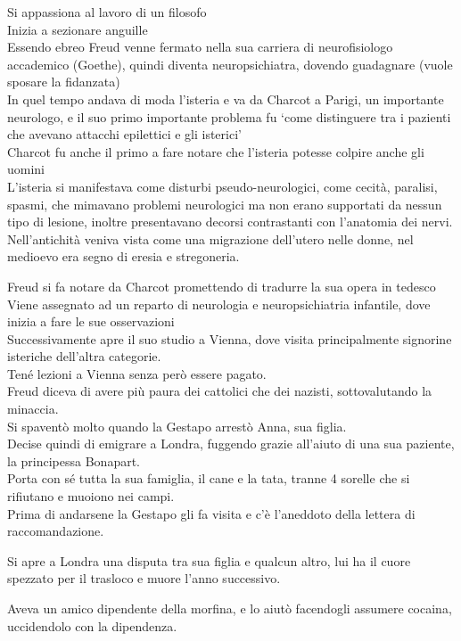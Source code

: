 \documentclass[
]{article}
\begin{document}
Si appassiona al lavoro di un filosofo\\
Inizia a sezionare anguille\\
Essendo ebreo Freud venne fermato nella sua carriera di neurofisiologo
accademico (Goethe), quindi diventa neuropsichiatra, dovendo guadagnare
(vuole sposare la fidanzata)\\
In quel tempo andava di moda l'isteria e va da Charcot a Parigi, un
importante neurologo, e il suo primo importante problema fu `come
distinguere tra i pazienti che avevano attacchi epilettici e gli
isterici'\\
Charcot fu anche il primo a fare notare che l'isteria potesse colpire
anche gli uomini\\
L'isteria si manifestava come disturbi pseudo-neurologici, come cecità,
paralisi, spasmi, che mimavano problemi neurologici ma non erano
supportati da nessun tipo di lesione, inoltre presentavano decorsi
contrastanti con l'anatomia dei nervi.\\
Nell'antichità veniva vista come una migrazione dell'utero nelle donne,
nel medioevo era segno di eresia e stregoneria.

Freud si fa notare da Charcot promettendo di tradurre la sua opera in
tedesco\\
Viene assegnato ad un reparto di neurologia e neuropsichiatria
infantile, dove inizia a fare le sue osservazioni\\
Successivamente apre il suo studio a Vienna, dove visita principalmente
signorine isteriche dell'altra categorie.\\
Tené lezioni a Vienna senza però essere pagato.\\
Freud diceva di avere più paura dei cattolici che dei nazisti,
sottovalutando la minaccia.\\
Si spaventò molto quando la Gestapo arrestò Anna, sua figlia.\\
Decise quindi di emigrare a Londra, fuggendo grazie all'aiuto di una sua
paziente, la principessa Bonapart.\\
Porta con sé tutta la sua famiglia, il cane e la tata, tranne 4 sorelle
che si rifiutano e muoiono nei campi.\\
Prima di andarsene la Gestapo gli fa visita e c'è l'aneddoto della
lettera di raccomandazione.

Si apre a Londra una disputa tra sua figlia e qualcun altro, lui ha il
cuore spezzato per il trasloco e muore l'anno successivo.

Aveva un amico dipendente della morfina, e lo aiutò facendogli assumere
cocaina, uccidendolo con la dipendenza.
\end{document}
